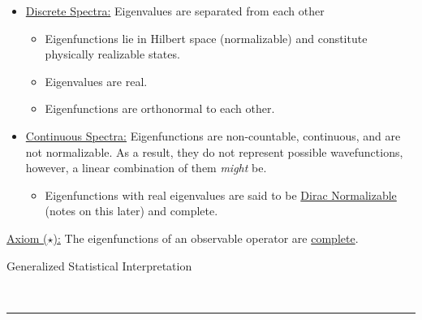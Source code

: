 \documentclass{article}
\newcommand{\header}[1]{\begin{large}\noindent #1\end{large}\\\rule{\textwidth}{0.5pt}}
\newcommand{\sheader}[1]{\underline{#1:}}
\begin{document}
    \begin{itemize}
        \item \sheader{Discrete Spectra} Eigenvalues are separated from each other
        \begin{itemize}
            \item Eigenfunctions lie in Hilbert space (normalizable) and constitute physically 
            realizable states.
            \item Eigenvalues are real.
            \item Eigenfunctions are orthonormal to each other.
        \end{itemize}
        \item \sheader{Continuous Spectra} Eigenfunctions are non-countable, continuous, and 
        are not normalizable. As a result, they do not represent possible wavefunctions, however,
        a linear combination of them \textit{might} be.
        \begin{itemize}
            \item Eigenfunctions with real eigenvalues are said to be \underline{Dirac Normalizable} (notes on this later) 
            and complete.
        \end{itemize}
    \end{itemize}
    \sheader{Axiom ($\star$)} The eigenfunctions of an observable operator are \underline{complete}.

    \pagebreak

    \header{Generalized Statistical Interpretation}
\end{document}
